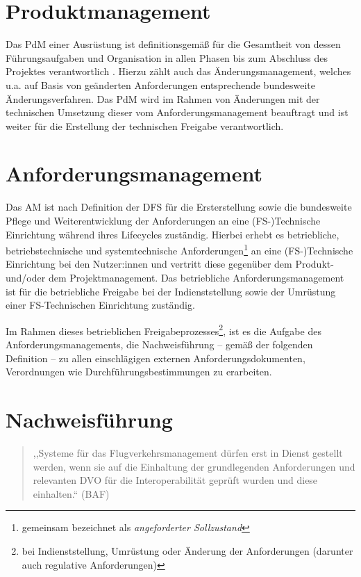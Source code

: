 \section{Produktmanagement}
    
    Das \ac{PdM} einer \atmans{} Ausrüstung ist definitionsgemäß für die Gesamtheit von dessen Führungsaufgaben und Organisation in allen Phasen bis zum Abschluss des Projektes verantwortlich \cite[31]{ba_technik}.
    Hierzu zählt auch das Änderungsmanagement, welches u.a. auf Basis von geänderten Anforderungen entsprechende bundesweite Änderungsverfahren. 
    Das \ac{PdM} wird im Rahmen von Änderungen mit der technischen Umsetzung dieser vom Anforderungsmanagement beauftragt und ist weiter für die Erstellung der technischen Freigabe verantwortlich.

\pagebreak
\section{Anforderungsmanagement}
    
    Das \acf{AM} ist nach Definition der \ac{DFS} für die Ersterstellung sowie die bundesweite Pflege und Weiterentwicklung der Anforderungen an eine (FS-)Technische Einrichtung während ihres Lifecycles zuständig. 
    Hierbei erhebt es betriebliche, betriebstechnische und systemtechnische Anforderungen\footnote{gemeinsam bezeichnet als \textit{angeforderter Sollzustand}} an eine (FS-)Technische Einrichtung bei den Nutzer:innen und vertritt diese gegenüber dem Produkt- und/oder dem Projektmanagement. 
    Das betriebliche Anforderungsmanagement ist für die betriebliche Freigabe bei der Indienststellung sowie der Umrüstung einer FS-Technischen Einrichtung zuständig. \cite[31]{ba_technik}

    \medskip
    Im Rahmen dieses betrieblichen Freigabeprozesses\footnote{bei Indienststellung, Umrüstung oder Änderung der Anforderungen (darunter auch regulative Anforderungen)}, ist es die Aufgabe des Anforderungsmanagements, die Nachweisführung -- gemäß der folgenden Definition -- zu allen einschlägigen externen Anforderungsdokumenten, Verordnungen wie Durchführungsbestimmungen zu erarbeiten.
    
\section{Nachweisführung}
    
    \begin{quote}
        ,,Systeme für das Flugverkehrsmanagement dürfen erst in Dienst gestellt werden, wenn sie auf die Einhaltung der grundlegenden Anforderungen und relevanten \ac{DVO} für die Interoperabilität geprüft wurden und diese einhalten.``
         (\ac{BAF}) \cite[17]{baf_iop}
    \end{quote}
    
